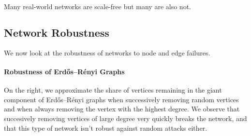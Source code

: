 \documentclass[english]{panikzettel}
\begin{document}
Many real-world networks are scale-free but many are also not.

\subsection{Network Robustness}

We now look at the robustness of networks to node and edge failures.

\begin{halfboxl}
    \paragraph{Robustness of Erdős–Rényi Graphs}
    On the right, we approximate the share of vertices remaining in the giant component of Erdős–Rényi graphs when successively \textcolor{bluishgreen}{removing random vertices} and when \textcolor{reddishpurple}{always removing the vertex with the highest degree}.
    We observe that succesively removing vertices of  large degree very quickly breaks the network, and that this type of network isn't robust against random attacks either.
\end{halfboxl}%
\begin{halfboxr}
    \vspace{-\baselineskip}
    \begin{center}
    \end{center}
\end{halfboxr}%
\vspace{-20pt}
\end{document}
